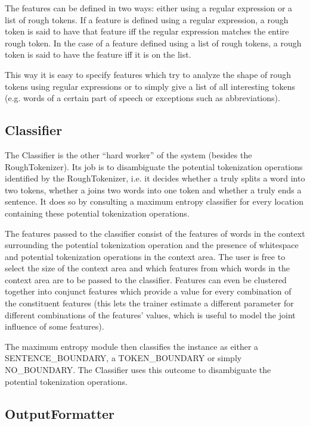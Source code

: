 The features can be defined in two ways: either using a regular
expression or a list of rough tokens. If a feature is defined using a
regular expression, a rough token is said to have that feature iff the
regular expression matches the entire rough token. In the case of a
feature defined using a list of rough tokens, a rough token is said to
have the feature iff it is on the list.

This way it is easy to specify features which try to analyze the shape
of rough tokens using regular expressions or to simply give a list of
all interesting tokens (e.g. words of a certain part of speech or
exceptions such as abbreviations).

\subsection{Classifier}

The Classifier is the other ``hard worker'' of the system (besides the
RoughTokenizer). Its job is to disambiguate the potential tokenization
operations identified by the RoughTokenizer, i.e. it decides whether a
\maysplit{} truly splits a word into two tokens, whether a \mayjoin{}
joins two words into one token and whether a \maybreaksentence{} truly
ends a sentence. It does so by consulting a maximum entropy classifier
for every location containing these potential tokenization operations.

The features passed to the classifier consist of the features of words
in the context surrounding the potential tokenization operation and
the presence of whitespace and potential tokenization operations in
the context area. The user is free to select the size of the context
area and which features from which words in the context area are to be
passed to the classifier. Features can even be clustered together into
conjunct features which provide a value for every combination of the
constituent features (this lets the trainer estimate a different
parameter for different combinations of the features' values, which is
useful to model the joint influence of some features).

The maximum entropy module then classifies the instance as either a
SENTENCE\_BOUNDARY, a TOKEN\_BOUNDARY or simply NO\_BOUNDARY. The
Classifier uses this outcome to disambiguate the potential
tokenization operations.

\subsection{OutputFormatter}

